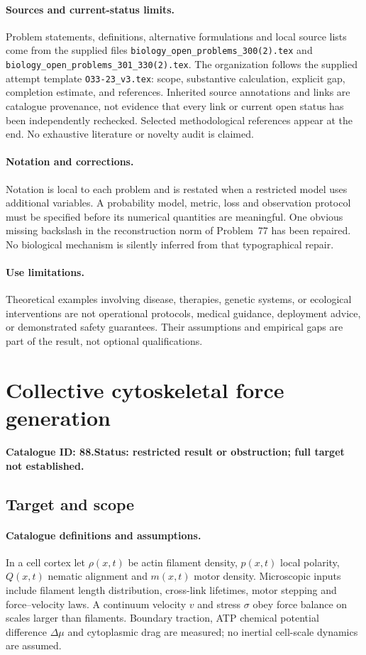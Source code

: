 \documentclass[11pt]{article}
\begin{document}
\paragraph{Sources and current-status limits.}
Problem statements, definitions, alternative formulations and local source lists
come from the supplied files
\texttt{biology\_open\_problems\_300(2).tex} and
\texttt{biology\_open\_problems\_301\_330(2).tex}.
The organization follows the supplied attempt template
\texttt{O33-23\_v3.tex}: scope, substantive calculation, explicit gap,
completion estimate, and references. Inherited source annotations and links are
catalogue provenance, not evidence that every link or current open status has
been independently rechecked. Selected methodological references appear at the
end. No exhaustive literature or novelty audit is claimed.

\paragraph{Notation and corrections.}
Notation is local to each problem and is restated when a restricted model uses
additional variables. A probability model, metric, loss and observation protocol
must be specified before its numerical quantities are meaningful. One obvious
missing backslash in the reconstruction norm of Problem~77 has been repaired.
No biological mechanism is silently inferred from that typographical repair.

\paragraph{Use limitations.}
Theoretical examples involving disease, therapies, genetic systems, or ecological
interventions are not operational protocols, medical guidance, deployment advice,
or demonstrated safety guarantees. Their assumptions and empirical gaps are part
of the result, not optional qualifications.

\setcounter{section}{87}
\section{Collective cytoskeletal force generation}
\label{prob:088}
\noindent\textbf{Catalogue ID: 88.}\quad \textbf{Status: restricted result or obstruction; full target not established.}
\subsection{Target and scope}
\paragraph{Catalogue definitions and assumptions.}
In a cell cortex let $\rho(x,t)$ be actin filament density, $p(x,t)$ local polarity, $Q(x,t)$ nematic alignment and $m(x,t)$ motor density. Microscopic inputs include filament length distribution, cross-link lifetimes, motor stepping and force--velocity laws. A continuum velocity $v$ and stress $\sigma$ obey force balance on scales larger than filaments. Boundary traction, ATP chemical potential difference $\Delta\mu$ and cytoplasmic drag are measured; no inertial cell-scale dynamics are assumed.
\end{document}
